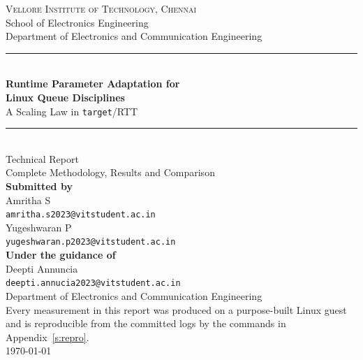\documentclass[11pt,a4paper]{article}
\begin{document}
\begin{titlepage}
\centering
\vspace*{1.0cm}
{\large\scshape Vellore Institute of Technology, Chennai}\\[0.3cm]
{\large School of Electronics Engineering}\\[0.2cm]
{\large Department of Electronics and Communication Engineering}\\[2.2cm]

\rule{\linewidth}{0.5pt}\\[0.5cm]
{\LARGE\bfseries Runtime Parameter Adaptation for\\[0.25cm]
Linux Queue Disciplines}\\[0.5cm]
{\Large A Scaling Law in \texttt{target}/RTT}\\[0.4cm]
\rule{\linewidth}{0.5pt}\\[1.0cm]

{\large Technical Report}\\[0.25cm]
{\normalsize Complete Methodology, Results and Comparison}\\[2.2cm]

{\large\bfseries Submitted by}\\[0.5cm]
{\large Amritha S}\\[0.1cm]
{\small\texttt{amritha.s2023@vitstudent.ac.in}}\\[0.35cm]
{\large Yugeshwaran P}\\[0.1cm]
{\small\texttt{yugeshwaran.p2023@vitstudent.ac.in}}\\[0.7cm]
{\large\bfseries Under the guidance of}\\[0.35cm]
{\large Deepti Annuncia}\\[0.1cm]
{\small\texttt{deepti.annucia2023@vitstudent.ac.in}}\\[0.2cm]
{\normalsize Department of Electronics and Communication Engineering}\\[1.1cm]

\vfill
{\normalsize Every measurement in this report was produced on a purpose-built
Linux guest and is reproducible from the committed logs by the commands in
Appendix~\ref{s:repro}.}\\[0.8cm]
{\large \today}
\end{titlepage}

\newpage
\end{document}
